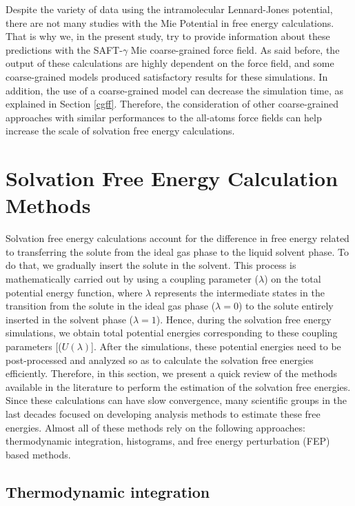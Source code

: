 Despite the variety of data using the intramolecular Lennard-Jones potential, there are not many studies with the Mie Potential in free energy calculations. That is why we, in the present study, try to provide information about these predictions with the SAFT-$\gamma$ Mie coarse-grained force field.  As said before, the output of these calculations are highly dependent on the force field, and some coarse-grained models produced satisfactory results for these simulations. In addition, the use of a coarse-grained model can decrease the simulation time, as explained in Section \ref{cgff}. Therefore, the consideration of other coarse-grained approaches with similar performances to the all-atoms force fields can help increase the scale of solvation free energy calculations. 

\section{Solvation Free Energy Calculation Methods}\label{SFECM}

Solvation free energy calculations account for the difference in free energy related to transferring the solute from the ideal gas phase to the liquid solvent phase. To do that, we gradually insert the solute in the solvent. This process is mathematically carried out by using a coupling parameter ($\lambda$) on the total potential energy function, where $\lambda$ represents the intermediate states in the transition from the solute in the ideal gas phase ($\lambda=0$) to the solute entirely inserted in the solvent phase ($\lambda = 1$). Hence,  during the solvation free energy simulations, we obtain total potential energies corresponding to these coupling parameters [($U(\lambda)$]. After the simulations, these potential energies need to be post-processed and analyzed so as to calculate the solvation free energies efficiently. Therefore, in this section, we present a quick review of the methods available in the literature to perform the estimation of the solvation free energies. Since these calculations can have slow convergence, many scientific groups in the last decades focused on developing analysis methods to estimate these free energies. Almost all of these methods rely on the following approaches:   thermodynamic integration, histograms, and free energy perturbation (FEP) based methods.

\subsection{Thermodynamic integration}

